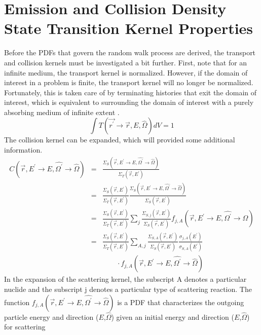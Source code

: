 \section{Emission and Collision Density State Transition Kernel Properties}
Before the PDFs that govern the random walk process are derived, the transport
and collision kernels must be investigated a bit further. First, note that
for an infinite medium, the transport kernel is normalized. However, if the
domain of interest in a problem is finite, the transport kernel will no longer
be normalized. Fortunately, this is taken care of by terminating histories 
that exit the domain of interest, which is equivalent to surrounding the domain
of interest with a purely absorbing medium of infinite extent 
\citep{irving_adjoint_1971}.
\begin{equation}
  \int T(\vec{r^{'}} \to \vec{r},E,\hat{\Omega})dV = 1
\end{equation}
The collision kernel can be expanded, which will provided some additional 
information. 
\begin{eqnarray}
  C(\vec{r},E^{'} \to E, \hat{\Omega^{'}} \to \hat{\Omega}) & = &
  \frac{\Sigma_S(\vec{r},E^{'} \to E,\hat{\Omega^{'}} \to \hat{\Omega})}
       {\Sigma_T(\vec{r},E^{'})} \nonumber \\
  \quad & = & \frac{\Sigma_S(\vec{r},E^{'})}{\Sigma_T(\vec{r},E^{'})}
  \frac{\Sigma_S(\vec{r},E^{'} \to E,\hat{\Omega^{'}} \to \hat{\Omega})}
       {\Sigma_S(\vec{r},E^{'})} \nonumber \\
  & = & \frac{\Sigma_S(\vec{r},E^{'})}{\Sigma_T(\vec{r},E^{'})} \sum_j
        \frac{\Sigma_{S,j}(\vec{r},E^{'})}{\Sigma_S(\vec{r},E^{'})}
        f_{j,A}(\vec{r},E^{'} \to E,\hat{\Omega^{'}} \to \hat{\Omega}) \nonumber\\
  & = & \frac{\Sigma_S(\vec{r},E^{'})}{\Sigma_T(\vec{r},E^{'})}
        \sum_{A,j} \frac{\Sigma_{S,A}(\vec{r},E^{'})}{\Sigma_S(\vec{r},E^{'})}  
        \frac{\sigma_{j,A}(E^{'})}{\sigma_{S,A}(E^{'})}  \\
        && \qquad \cdot
        f_{j,A}(\vec{r},E^{'} \to E,\hat{\Omega^{'}} \to \hat{\Omega}) \nonumber
\end{eqnarray}
In the expansion of the scattering kernel, the subscript A denotes a particular
nuclide and the subscript j denotes a particular type of scattering reaction. 
The function 
$f_{j,A}(\vec{r},E^{'} \to E,\hat{\Omega^{'}} \to \hat{\Omega})$ is a PDF that 
characterizes the outgoing particle energy and direction ($E$,$\hat{\Omega}$) 
given an initial energy and direction ($E$,$\hat{\Omega}$) for scattering 
